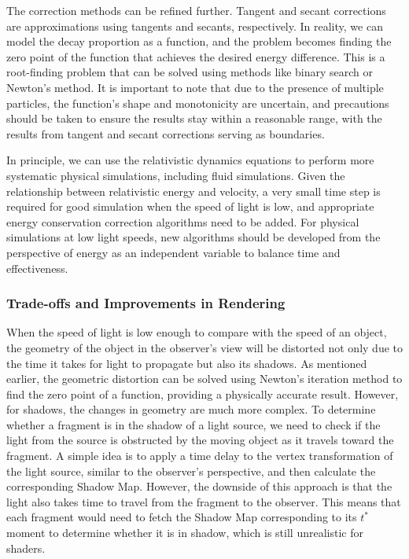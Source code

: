 \documentclass{article}
\begin{document}
The correction methods can be refined further. Tangent and secant corrections are approximations using tangents and secants, respectively. In reality, we can model the decay proportion as a function, and the problem becomes finding the zero point of the function that achieves the desired energy difference. This is a root-finding problem that can be solved using methods like binary search or Newton's method. It is important to note that due to the presence of multiple particles, the function's shape and monotonicity are uncertain, and precautions should be taken to ensure the results stay within a reasonable range, with the results from tangent and secant corrections serving as boundaries.

In principle, we can use the relativistic dynamics equations to perform more systematic physical simulations, including fluid simulations. Given the relationship between relativistic energy and velocity, a very small time step is required for good simulation when the speed of light is low, and appropriate energy conservation correction algorithms need to be added. For physical simulations at low light speeds, new algorithms should be developed from the perspective of energy as an independent variable to balance time and effectiveness.

\subsubsection*{Trade-offs and Improvements in Rendering}

When the speed of light is low enough to compare with the speed of an object, the geometry of the object in the observer's view will be distorted not only due to the time it takes for light to propagate but also its shadows. As mentioned earlier, the geometric distortion can be solved using Newton's iteration method to find the zero point of a function, providing a physically accurate result. However, for shadows, the changes in geometry are much more complex. To determine whether a fragment is in the shadow of a light source, we need to check if the light from the source is obstructed by the moving object as it travels toward the fragment. A simple idea is to apply a time delay to the vertex transformation of the light source, similar to the observer’s perspective, and then calculate the corresponding Shadow Map. However, the downside of this approach is that the light also takes time to travel from the fragment to the observer. This means that each fragment would need to fetch the Shadow Map corresponding to its \(t^{*}\) moment to determine whether it is in shadow, which is still unrealistic for shaders.
\end{document}

